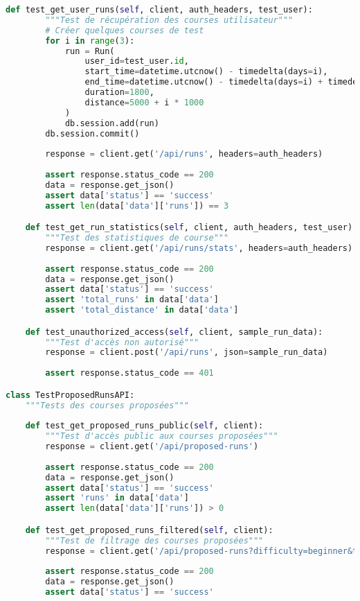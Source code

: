 \begin{lstlisting}[language=python, caption=Suite de tests API complète]
    def test_get_user_runs(self, client, auth_headers, test_user):
        """Test de récupération des courses utilisateur"""
        # Créer quelques courses de test
        for i in range(3):
            run = Run(
                user_id=test_user.id,
                start_time=datetime.utcnow() - timedelta(days=i),
                end_time=datetime.utcnow() - timedelta(days=i) + timedelta(minutes=30),
                duration=1800,
                distance=5000 + i * 1000
            )
            db.session.add(run)
        db.session.commit()
        
        response = client.get('/api/runs', headers=auth_headers)
        
        assert response.status_code == 200
        data = response.get_json()
        assert data['status'] == 'success'
        assert len(data['data']['runs']) == 3

    def test_get_run_statistics(self, client, auth_headers, test_user):
        """Test des statistiques de course"""
        response = client.get('/api/runs/stats', headers=auth_headers)
        
        assert response.status_code == 200
        data = response.get_json()
        assert data['status'] == 'success'
        assert 'total_runs' in data['data']
        assert 'total_distance' in data['data']

    def test_unauthorized_access(self, client, sample_run_data):
        """Test d'accès non autorisé"""
        response = client.post('/api/runs', json=sample_run_data)
        
        assert response.status_code == 401

class TestProposedRunsAPI:
    """Tests des courses proposées"""
    
    def test_get_proposed_runs_public(self, client):
        """Test d'accès public aux courses proposées"""
        response = client.get('/api/proposed-runs')
        
        assert response.status_code == 200
        data = response.get_json()
        assert data['status'] == 'success'
        assert 'runs' in data['data']
        assert len(data['data']['runs']) > 0

    def test_get_proposed_runs_filtered(self, client):
        """Test de filtrage des courses proposées"""
        response = client.get('/api/proposed-runs?difficulty=beginner&type=endurance')
        
        assert response.status_code == 200
        data = response.get_json()
        assert data['status'] == 'success'
        

\end{lstlisting}
